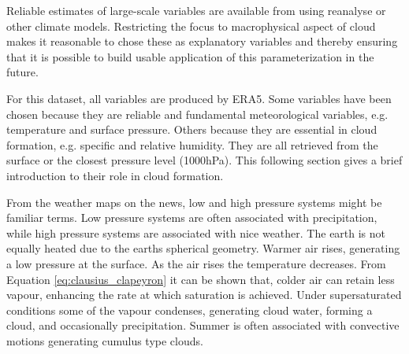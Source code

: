 Reliable estimates of large-scale variables are available from using reanalyse or other climate models. Restricting the focus to macrophysical aspect of cloud makes it reasonable to chose these as explanatory variables and thereby ensuring that it is possible to build usable application of this parameterization in the future.

For this dataset, all variables are produced by ERA5. Some variables have been chosen because they are reliable and fundamental meteorological variables, e.g. temperature and surface pressure. Others because they are essential in cloud formation, e.g. specific and relative humidity. They are all retrieved from the surface or the closest pressure level (1000hPa). This following section gives a brief introduction to their role in cloud formation. %

From the weather maps on the news, low and high pressure systems might be familiar terms. Low pressure systems are often associated with precipitation, while high pressure systems are associated with nice weather. The earth is not equally heated due to the earths spherical geometry. Warmer air rises, generating a low pressure at the surface. As the air rises the temperature decreases. From Equation \eqref{eq:clausius_clapeyron} it can be shown that, colder air can retain less vapour, enhancing the rate at which saturation is achieved. Under supersaturated conditions some of the vapour condenses, generating cloud water, forming a cloud, and occasionally precipitation. Summer is often associated with convective motions generating cumulus type clouds. %

